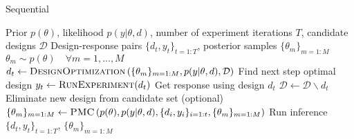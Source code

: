 \begin{algorithm}[t]
	\small
	\captionsetup{labelfont=bf, justification=justified,singlelinecheck=false}
	\caption{Sequential \Bad \label{alg:bad}}
	\begin{algorithmic}[1]
		\renewcommand{\algorithmicrequire}{\textbf{Inputs:}}
		\renewcommand{\algorithmicensure}{\textbf{Outputs:}}				 
		\Require Prior $p(\theta)$, likelihood $p(y | \theta, d)$, number of experiment iterations $T$,
		candidate designs $\mathcal{D}$
		\Ensure Design-response pairs $\{d_t,y_t\}_{t=1:T}$, posterior samples $\{\theta_m\}_{m=1:M}$
		\State $\theta_m\sim p(\theta) \quad \forall m = 1, \dots, M$
		\State $d_t \leftarrow \textsc{DesignOptimization}\left(\{\theta_m\}_{m=1:M},p(y | \theta, d),
		\mathcal{D}\right)$ \Comment Find next step optimal design
		\State $y_t \leftarrow \textsc{RunExperiment}(d_t)$ \Comment Get response using design $d_t$
		\State $\mathcal{D}\leftarrow\mathcal{D}\backslash d_t$ 
		\Comment Eliminate new design from candidate set (optional)
		\State $\{\theta_m\}_{m=1:M} \leftarrow \textsc{PMC}\left(p(\theta),p(y | \theta, d),\{d_i,y_i\}_{i=1:t},
		\{\theta_m\}_{m=1:M} \right)$ 
		\Comment  Run inference
		\EndFor
		\State \Return $\{d_t,y_t\}_{t=1:T}$, $\{\theta_m\}_{m=1:M}$
	\end{algorithmic}
\end{algorithm}


